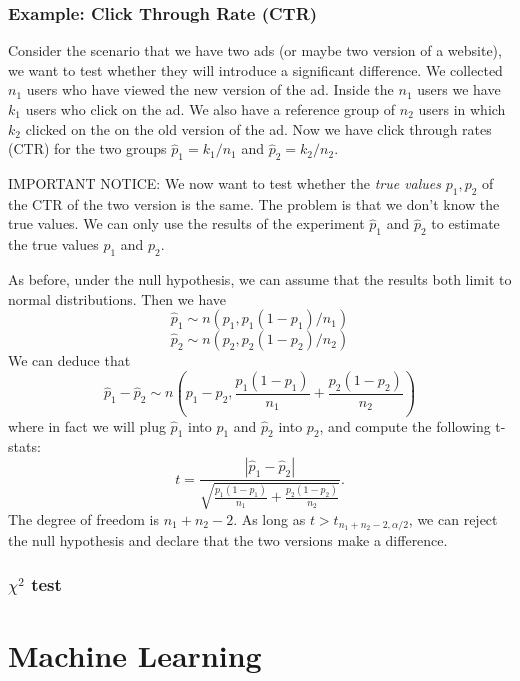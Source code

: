 \documentclass[12pt]{amsart}
\numberwithin{equation}{section}
\theoremstyle{plain}
\theoremstyle{definition}
\begin{document}
\subsubsection{Example: Click Through Rate (CTR)}

Consider the scenario that we have two ads (or maybe two version of a website), we want to test whether they will introduce a significant difference. We collected $n_1$ users who have viewed the new version of the ad. Inside the $n_1$ users we have $k_1$ users who click on the ad. We also have a reference group of $n_2$ users in which $k_2$ clicked on the on the old version of the ad. Now we have click through rates (CTR) for the two groups $\hat p_1 = k_1/n_1$ and $\hat p_2 = k_2/n_2$.

IMPORTANT NOTICE: We now want to test whether the {\em true values} $p_1, p_2$ of the CTR of the two version is the same. The problem is that we don't know the true values. We can only use the results of the experiment $\hat p_1$ and $\hat p_2$ to estimate the true values $p_1$ and $p_2$.

As before, under the null hypothesis, we can assume that the results both limit to normal distributions. Then we have
$$
\hat p_1 \sim n(p_1,p_1(1-p_1)/n_1)
$$
$$
\hat p_2 \sim n(p_2,p_2(1-p_2)/n_2)
$$
We can deduce that
$$
\hat p_1 - \hat p_2 \sim n(p_1-p_2, \frac{p_1(1-p_1)}{n_1}+\frac{p_2(1-p_2)}{n_2})
$$
where in fact we will plug $\hat p_1$ into $p_1$ and $\hat p_2$ into $p_2$, and compute the following t-stats:
$$
t = \frac{|\hat p_1-\hat p_2|}{\sqrt{\frac{p_1(1-p_1)}{n_1}+\frac{p_2(1-p_2)}{n_2}}}.
$$
The degree of freedom is $n_1+n_2-2$. As long as $t>t_{n_1+n_2-2, \alpha/2}$, we can reject the null hypothesis and declare that the two versions make a difference.

\subsubsection{$\chi^2$ test}
\section{Machine Learning}
\end{document}
